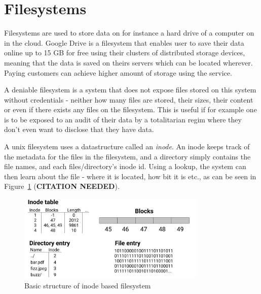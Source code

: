 \section{Filesystems}
Filesystems are used to store data on for instance a hard drive of a computer on in the cloud. Google Drive is a filesystem that enables user to save their data online up to 15 GB for free\cite{CloudStorageWork} using their clusters of distributed storage devices, meaning that the data is saved on theirs servers which can be located wherever\cite{DistributedStorageWhat}. Paying customers can achieve higher amount of storage using the service.

A deniable filesystem is a system that does not expose files stored on this system without credentials - neither how many files are stored, their sizes, their content or even if there exists any files on the filesystem\cite{petersDEFYDeniableFile2014}. This is useful if for example one is to be exposed to an audit of their data by a totalitarian regim where they don't even want to disclose that they have data.

A unix filesystem uses a datastructure called an \textit{inode}. An inode keeps track of the metadata for the files in the filesystem, and a directory simply contains the file names, and each files/directory's inode id. Using a lookup, the system can then learn about the file - where it is located, how bit it is etc., as can be seen in Figure~\ref{fig:inode_diag} (\textbf{CITATION NEEDED}).

\begin{figure}[!ht]
	\begin{center}
	  \includegraphics[width=0.8\textwidth]{figures/inode_diagram.png}
	\end{center}
	\caption{Basic structure of inode based filesystem}
	\label{fig:inode_diag}
\end{figure}
